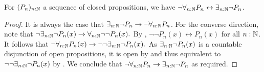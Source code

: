 \begin{lemma}\label{ClosedMarkov}
  For $(P_n)_{n:\mathbb{N}}$ a sequence of closed propositions, we have 
  $\neg \forall_{n:\mathbb{N}} P_n \leftrightarrow  \exists_{n:\mathbb{N}} \neg P_n$. 
\end{lemma}
\begin{proof}
  It is always the case that $\exists_{n:\mathbb{N}}\neg P_n \to \neg \forall_{n:\mathbb{N}} P_n$. 
  For the converse direction,
  note that $\neg \exists_{n:\mathbb{N}} \neg P_n(x) \to \forall_{n:\mathbb{N}} \neg \neg P_n(x).$
  By , $\neg \neg  P_n(x)\leftrightarrow P_n(x)$ for all $n:\mathbb{N}$. 
  It follows that 
  $\neg \forall_{n:\mathbb{N}} P_n(x)\to 
  \neg \neg \exists_{n:\mathbb{N}} \neg P_n(x).$
  As $\exists_{n:\mathbb{N}}\neg P_n(x)$ is a countable disjunction of open propositions, 
  it is open by  and thus equivalent to 
  $\neg\neg\exists_{n:\mathbb{N}} \neg P_n(x)$ by .
  We conclude that $\neg \forall_{n:\mathbb{N}} P_n \to \exists_{n:\mathbb{N}} \neg P_n$ as required. 
\end{proof} 

%
%
